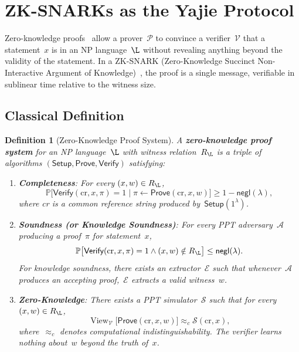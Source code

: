 \documentclass[12pt,a4paper]{article}
\newtheorem{definition}[theorem]{Definition}
\theoremstyle{remark}
\newcommand{\Pbb}{\mathbb{P}}
\newcommand{\Verify}{\textsf{Verify}}
\newcommand{\Prover}{\mathcal{P}}
\newcommand{\Verifier}{\mathcal{V}}
\newcommand{\Adv}{\mathcal{A}}
\newcommand{\Sim}{\mathcal{S}}
\newcommand{\Ext}{\mathcal{E}}
\newcommand{\Setup}{\textsf{Setup}}
\newcommand{\Prove}{\textsf{Prove}}
\newcommand{\negl}{\textsf{negl}}
\DeclareMathOperator{\View}{View}
\begin{document}
\section{ZK-SNARKs as the Yajie Protocol}
\label{sec:zk}

Zero-knowledge proofs~\cite{goldwasser1989knowledge} allow a prover~$\Prover$ to convince a verifier~$\Verifier$ that a statement~$x$ is in an NP language~$\L$ without revealing anything beyond the validity of the statement. In a ZK-SNARK (Zero-Knowledge Succinct Non-Interactive Argument of Knowledge)~\cite{groth2016size}, the proof is a single message, verifiable in sublinear time relative to the witness size.

\subsection{Classical Definition}

\begin{definition}[Zero-Knowledge Proof System]
\label{def:zk_proof}
A \textbf{zero-knowledge proof system} for an NP language~$\L$ with witness relation~$R_{\L}$ is a triple of algorithms $(\Setup, \Prove, \Verify)$ satisfying:
\begin{enumerate}[leftmargin=*, label=(\roman*)]
  \item \textbf{Completeness}: For every $(x, w) \in R_{\L}$,
    \[
      \Pbb\big[\Verify(\text{cr}, x, \pi) = 1 \mid \pi \leftarrow \Prove(\text{cr}, x, w)\big] \geq 1 - \negl(\lambda),
    \]
    where cr is a common reference string produced by~$\Setup(1^\lambda)$.
  \item \textbf{Soundness (or Knowledge Soundness)}: For every PPT adversary~$\Adv$ producing a proof~$\pi$ for statement~$x$,
    \[
      \Pbb\big[\Verify(\text{cr}, x, \pi) = 1 \land (x, w) \notin R_{\L}\big] \leq \negl(\lambda).
    \]
    For knowledge soundness, there exists an extractor~$\Ext$ such that whenever~$\Adv$ produces an accepting proof,~$\Ext$ extracts a valid witness~$w$.
  \item \textbf{Zero-Knowledge}: There exists a PPT simulator~$\Sim$ such that for every $(x, w) \in R_{\L}$,
    \[
      \View_{\Verifier}\big[\Prove(\text{cr}, x, w)\big] \approx_c \Sim(\text{cr}, x),
    \]
    where~$\approx_c$ denotes computational indistinguishability. The verifier learns nothing about~$w$ beyond the truth of~$x$.
\end{enumerate}
\end{definition}
\end{document}
